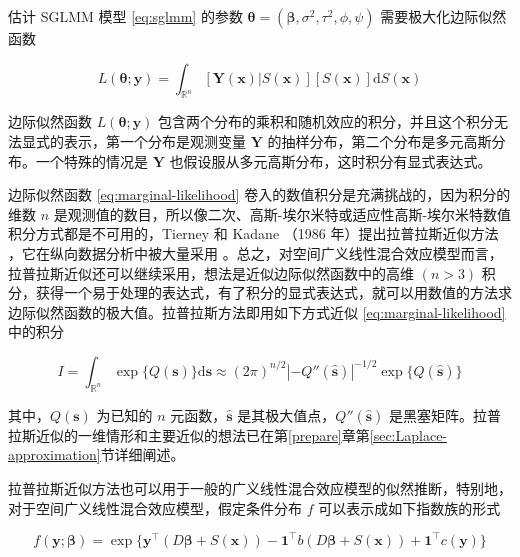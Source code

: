 \documentclass[12pt,a4paper,UTF8,twoside]{book}
\theoremstyle{definition}
\theoremstyle{definition}
\theoremstyle{definition}
\theoremstyle{remark}
\begin{document}
估计 SGLMM 模型 \eqref{eq:sglmm} 的参数 \(\boldsymbol{\theta} = (\boldsymbol{\beta},\sigma^2,\tau^2,\phi,\psi)\) 需要极大化边际似然函数

\begin{equation}
L(\boldsymbol{\theta};\mathbf{y}) = \int_{\mathbb{R}^n} [\mathbf{Y(x)}|S(\mathbf{x})][S(\mathbf{x})]\mathrm{d}S(\mathbf{x}) \label{eq:marginal-likelihood}
\end{equation}

\noindent 边际似然函数 \(L(\boldsymbol{\theta};\mathbf{y})\) 包含两个分布的乘积和随机效应的积分，并且这个积分无法显式的表示，第一个分布是观测变量 \(\mathbf{Y}\) 的抽样分布，第二个分布是多元高斯分布。一个特殊的情况是 \(\mathbf{Y}\) 也假设服从多元高斯分布，这时积分有显式表达式。

边际似然函数 \eqref{eq:marginal-likelihood} 卷入的数值积分是充满挑战的，因为积分的维数 \(n\) 是观测值的数目，所以像二次、高斯-埃尔米特或适应性高斯-埃尔米特数值积分方式都是不可用的，Tierney 和 Kadane （1986 年）提出拉普拉斯近似方法 \citep{Tierney1986}，它在纵向数据分析中被大量采用 \citep{Diggle2002Analysis}。总之，对空间广义线性混合效应模型而言，拉普拉斯近似还可以继续采用，想法是近似边际似然函数中的高维 \((n > 3)\) 积分，获得一个易于处理的表达式，有了积分的显式表达式，就可以用数值的方法求边际似然函数的极大值。拉普拉斯方法即用如下方式近似 \eqref{eq:marginal-likelihood} 中的积分

\begin{equation}
I   =  \int_{\mathbb{R}^n} \exp\{Q(\mathbf{s})\}\mathrm{d}\mathbf{s} 
  \approx  (2\pi)^{n/2} |-Q''(\hat{\mathbf{s}})|^{-1/2}\exp\{Q(\hat{\mathbf{s}})\} \label{eq:laplace-approximate}
\end{equation}

\noindent 其中，\(Q(\mathbf{s})\) 为已知的 \(n\) 元函数，\(\hat{\mathbf{s}}\) 是其极大值点，\(Q''(\hat{\mathbf{s}})\) 是黑塞矩阵。拉普拉斯近似的一维情形和主要近似的想法已在第\ref{prepare}章第\ref{sec:Laplace-approximation}节详细阐述。

拉普拉斯近似方法也可以用于一般的广义线性混合效应模型的似然推断，特别地，对于空间广义线性混合效应模型，假定条件分布 \(f\) 可以表示成如下指数族的形式

\begin{equation}
f(\mathbf{y};\boldsymbol{\beta})  = \exp\{\mathbf{y}^{\top} (D\boldsymbol{\beta} + S(\mathbf{x})) - \mathbf{1}^{\top} b( D\boldsymbol{\beta} + S(\mathbf{x})) + \mathbf{1}^{\top} c(\mathbf{y}) \}  \label{eq:exponential-family}
\end{equation}
\end{document}
